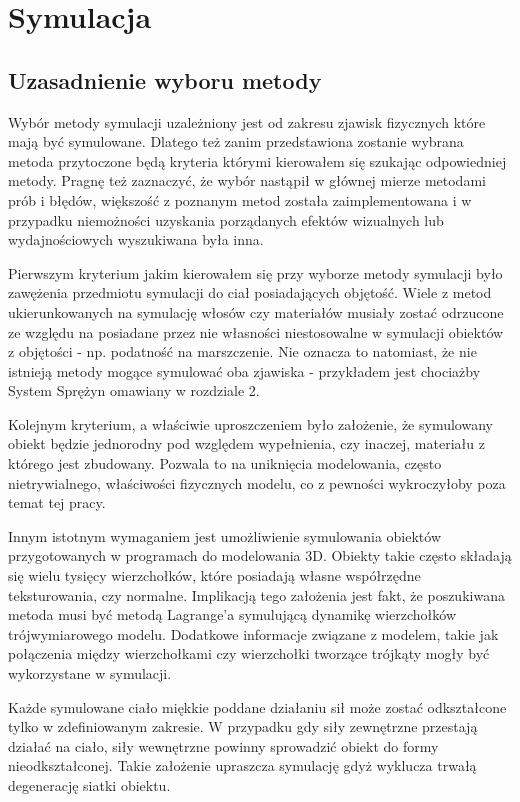 \chapter{Symulacja}

\section{Uzasadnienie wyboru metody}

Wybór metody symulacji uzależniony jest od zakresu zjawisk fizycznych które mają
być symulowane. Dlatego też zanim przedstawiona zostanie wybrana metoda
przytoczone będą kryteria którymi kierowałem się szukając odpowiedniej metody.
Pragnę też zaznaczyć, że wybór nastąpił w głównej mierze metodami prób i błędów,
większość z poznanym metod została zaimplementowana i w przypadku niemożności
uzyskania porządanych efektów wizualnych lub wydajnościowych wyszukiwana była
inna.

Pierwszym kryterium jakim kierowałem się przy wyborze metody symulacji było
zawężenia przedmiotu symulacji do ciał posiadających objętość. Wiele z
metod ukierunkowanych na symulację włosów czy materiałów musiały zostać odrzucone ze
względu na posiadane przez nie własności niestosowalne w
symulacji obiektów z objętości - np. podatność na marszczenie. Nie oznacza to
natomiast, że nie istnieją metody mogące symulować oba zjawiska - przykładem
jest chociażby System Sprężyn omawiany w rozdziale 2.

Kolejnym kryterium, a właściwie uproszczeniem było założenie, że
symulowany obiekt będzie jednorodny pod względem wypełnienia, czy inaczej,
materiału z którego jest zbudowany. Pozwala to na
uniknięcia modelowania, często nietrywialnego, właściwości fizycznych modelu, co z pewności
wykroczyłoby poza temat tej pracy. 

Innym istotnym wymaganiem jest umożliwienie symulowania obiektów
przygotowanych w programach do modelowania 3D. Obiekty takie często składają się
wielu tysięcy wierzchołków, które posiadają własne współrzędne teksturowania,
czy normalne. Implikacją tego założenia jest fakt, że poszukiwana metoda musi być
metodą Lagrange'a symulującą dynamikę wierzchołków trójwymiarowego modelu.
Dodatkowe informacje związane z modelem, takie jak połączenia między
wierzchołkami czy wierzchołki tworzące trójkąty mogły być wykorzystane w
symulacji.

Każde symulowane ciało miękkie poddane działaniu sił może zostać odkształcone
tylko w zdefiniowanym zakresie. W przypadku gdy siły zewnętrzne przestają działać
na ciało, siły wewnętrzne powinny sprowadzić obiekt do formy nieodkształconej.
Takie założenie upraszcza symulację gdyż wyklucza trwałą degenerację siatki
obiektu.

